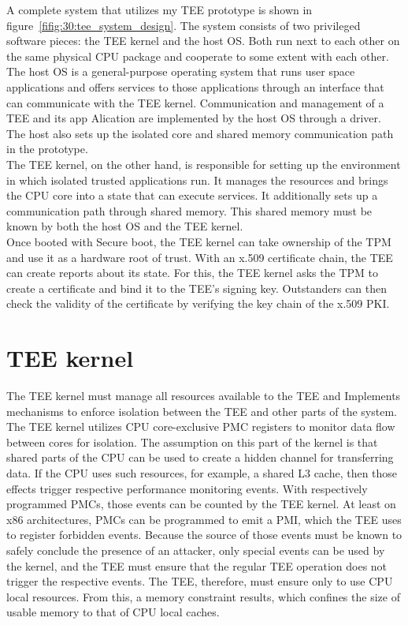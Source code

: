 A complete system that utilizes my TEE prototype is shown in
figure~\ref{fifig:30:tee_system_design}. The system consists of two privileged
software pieces: the TEE kernel and the host OS. Both run next to each other on
the same physical CPU package and cooperate to some extent with each other.\\

The host OS is a general-purpose operating system that runs user space
applications and offers services to those applications through an interface that
can communicate with the TEE kernel. Communication and management of a TEE and
its app Alication are implemented by the host OS through a driver. The host also
sets up the isolated core and shared memory communication path in the prototype.
\\

The TEE kernel, on the other hand, is responsible for setting up the environment
in which isolated trusted applications run. It manages the resources and brings
the CPU core into a state that can execute services. It additionally sets up a
communication path through shared memory. This shared memory must be known by
both the host OS and the TEE kernel.\\

Once booted with Secure boot, the TEE kernel can take ownership of the TPM and
use it as a hardware root of trust. With an x.509 certificate chain, the TEE can
create reports about its state. For this, the TEE kernel asks the TPM to create
a certificate and bind it to the TEE's signing key. Outstanders can then check
the validity of the certificate by verifying the key chain of the x.509 PKI.


\section{TEE kernel}
\label{sec:30:tee_kernel}

The TEE kernel must manage all resources available to the  TEE and Implements
mechanisms to enforce isolation between the TEE and other parts of the system.\\

The TEE kernel utilizes CPU core-exclusive PMC registers to monitor data flow
between cores for isolation. The assumption on this part of the kernel is that
shared parts of the CPU can be used to create a hidden channel for transferring
data. If the CPU uses such resources, for example, a shared L3 cache, then those
effects trigger respective performance monitoring events. With respectively
programmed PMCs, those events can be counted by the TEE kernel. At least on x86
architectures, PMCs can be programmed to emit a PMI, which the TEE uses to
register forbidden events. Because the source of those events must be known to
safely conclude the presence of an attacker, only special events can be used by
the kernel, and the TEE must ensure that the regular TEE operation does not
trigger the respective events. The TEE, therefore, must ensure only to use CPU
local resources. From this, a memory constraint results, which confines the size
of usable memory to that of CPU local caches.\\

